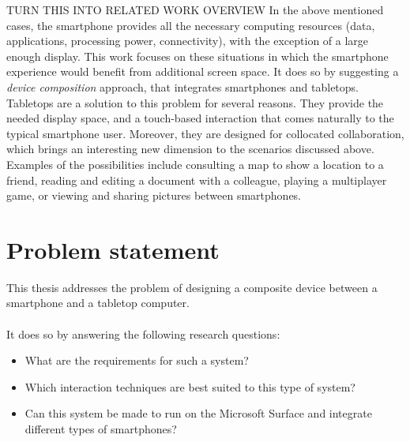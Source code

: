 TURN THIS INTO RELATED WORK OVERVIEW
In the above mentioned cases, the smartphone provides all the necessary computing resources (data, applications, processing power, connectivity), with the exception of a large enough display.
This work focuses on these situations in which the smartphone experience would benefit from additional screen space.
It does so by suggesting a \emph{device composition} approach, that integrates smartphones and tabletops.
Tabletops are a solution to this problem for several reasons.
They provide the needed display space, and a touch-based interaction that comes naturally to the typical smartphone user.
Moreover, they are designed for collocated collaboration, which brings an interesting new dimension to the scenarios discussed above.
Examples of the possibilities include consulting a map to show a location to a friend, reading and editing a document with a colleague, playing a multiplayer game, or viewing and sharing pictures between smartphones.


%

\section{Problem statement}

This thesis addresses the problem of designing a composite device between a smartphone and a tabletop computer.
\\\\
It does so by answering the following research questions:
\begin{itemize}
\item What are the requirements for such a system?
\item Which interaction techniques are best suited to this type of system?
\item Can this system be made to run on the Microsoft Surface and integrate different types of smartphones?
\end{itemize}

